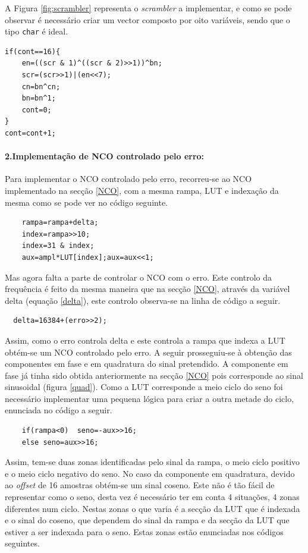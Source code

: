 \documentclass[11pt]{article}
\numberwithin{equation}{section}
\begin{document}
A Figura \ref{fig:scrambler} representa o \textit{scrambler} a implementar, e como se pode observar é necessário criar um vector composto por oito variáveis, sendo que o tipo \texttt{char} é ideal.


\begin{lstlisting}
if(cont==16){
	en=((scr & 1)^((scr & 2)>>1))^bn;
	scr=(scr>>1)|(en<<7);
	cn=bn^cn;
	bn=bn^1;
	cont=0;
}
cont=cont+1;
\end{lstlisting}



\paragraph{2.Implementação de NCO controlado pelo erro:} \hspace{0pt}

Para implementar o NCO controlado pelo erro, recorreu-se ao NCO implementado na secção \ref{NCO}, com a mesma rampa, LUT e indexação da mesma como se pode ver no código seguinte.
\begin{lstlisting}
	rampa=rampa+delta;
	index=rampa>>10;
	index=31 & index;
	aux=ampl*LUT[index];aux=aux<<1;
\end{lstlisting}
Mas agora falta a parte de controlar o NCO com o erro. Este controlo da frequência é feito da mesma maneira que na secção \ref{NCO}, através da variável delta (equação \ref{delta}), este controlo observa-se na linha de código a seguir.
\begin{lstlisting}
  delta=16384+(erro>>2);
\end{lstlisting}
Assim, como o erro controla delta e este controla a rampa que indexa a LUT obtém-se um NCO controlado pelo erro.
A seguir prosseguiu-se à obtenção das componentes em fase e em quadratura do sinal pretendido. A componente em fase já tinha sido obtida anteriormente na secção \ref{NCO} pois corresponde ao sinal sinusoidal (figura \ref{quad}). Como a LUT corresponde a meio ciclo do seno foi necessário implementar uma pequena lógica para criar a outra metade do ciclo, enunciada no código a seguir.
\begin{lstlisting}
	if(rampa<0)  seno=-aux>>16;
	else seno=aux>>16;
\end{lstlisting}
Assim, tem-se duas zonas identificadas pelo sinal da rampa, o meio ciclo positivo e o meio ciclo negativo do seno.
No caso da componente em quadratura, devido ao \textit{offset} de 16 amostras obtém-se um sinal coseno. Este não é tão fácil de representar como o seno, desta vez é necessário ter em conta 4 situações, 4 zonas diferentes num ciclo. Nestas zonas o que varia é a secção da LUT que é indexada e o sinal do coseno, que dependem do sinal da rampa e da secção da LUT que estiver a ser indexada para o seno. Estas zonas estão enunciadas nos códigos seguintes.
\vspace{1mm}
\end{document}
